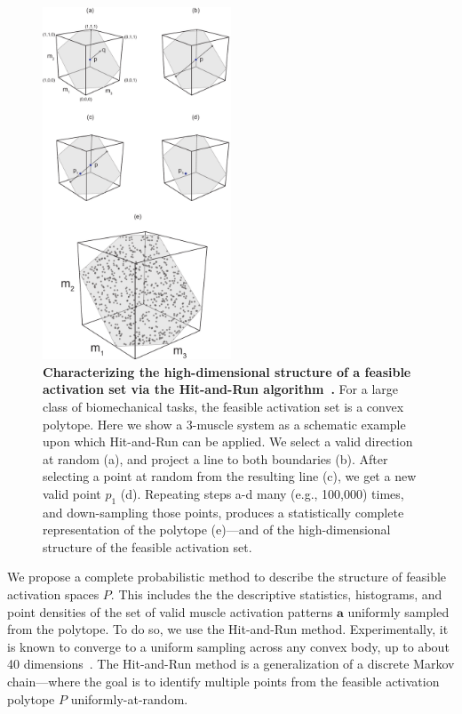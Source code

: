 \documentclass[letterpaper]{article}
\begin{document}
\begin{figure}[htbp]
\centering
\includegraphics[width=0.5\textwidth]{numbered_figures/figure_2_hit_and_run_ALL_steps.pdf}
\caption{\textbf{Characterizing the high-dimensional structure of a feasible activation set via the Hit-and-Run algorithm~\cite{lovasz1999hit}.}  For a large class of biomechanical tasks, the feasible activation set is a convex polytope. Here we show a 3-muscle system as a schematic example upon which Hit-and-Run can be applied. We select a valid direction at random (a), and project a line to both boundaries (b). After selecting a point at random from the resulting line (c), we get a new valid point $p_1$ (d). Repeating steps a-d many (e.g., 100,000) times, and down-sampling those points, produces a statistically complete representation of the polytope (e)---and of the high-dimensional structure of the feasible activation set.}
\label{fig:figure_2_hit_and_run_steps}
\end{figure}


We propose a complete probabilistic method to describe the structure of feasible activation spaces $P$. This includes the the descriptive statistics, histograms, and point densities of the set of valid muscle activation patterns $\textbf{a}$ uniformly sampled from the polytope. To do so, we use the Hit-and-Run method. Experimentally, it is known to converge to a uniform sampling across any convex body, up to about 40 dimensions~\cite{smith1984efficient}. The Hit-and-Run method is a generalization of a discrete Markov chain---where the goal is to identify multiple points from the feasible activation polytope $P$ uniformly-at-random.
\end{document}
